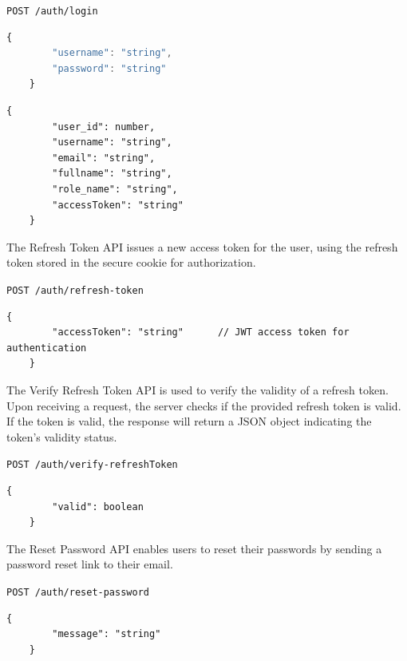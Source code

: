\texttt{POST /auth/login}
\begin{lstlisting}[language=Javascript, caption=Request body of Login API]
	{
		"username": "string",
		"password": "string"
	}
\end{lstlisting}



\begin{lstlisting}[breaklines=true, caption=Response of Login API]
	{
		"user_id": number,         
		"username": "string",        
		"email": "string",           
		"fullname": "string",        
		"role_name": "string",       
		"accessToken": "string"      
	}
\end{lstlisting}

\vspace*{0.5cm}
The Refresh Token API issues a new access token for the user, using the refresh token stored in the secure cookie for authorization.

\texttt{POST /auth/refresh-token}
\begin{lstlisting}[breaklines=true, caption=Response of Refresh Token API]
	{
		"accessToken": "string"      // JWT access token for authentication
	}
\end{lstlisting}

\vspace*{0.5cm}

The Verify Refresh Token API is used to verify the validity of a refresh token. Upon receiving a request, the server checks if the provided refresh token is valid. If the token is valid, the response will return a JSON object indicating the token's validity status.
	
\texttt{POST /auth/verify-refreshToken}
\begin{lstlisting}[breaklines=true, caption=Response of Verify Refresh Token API]
	{
		"valid": boolean   
	}
\end{lstlisting}



\newpage
The Reset Password API enables users to reset their passwords by sending a password reset link to their email. 

\texttt{POST /auth/reset-password}
\begin{lstlisting}[breaklines=true, caption=Response of Reset Password API]
	{
		"message": "string"   
	}
\end{lstlisting}



